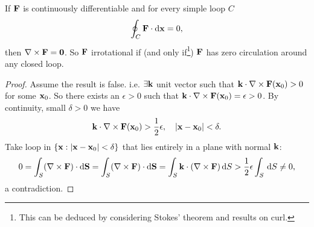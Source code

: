 \begin{proposition}
    If ${\bf F}$ is continuously differentiable and for every simple loop $C$ 
    \[
        \oint_{C} {\bf F} \cdot \mathrm{d}{\bf x} = 0,
    \]
    then $ \nabla\times {\bf F}=\mathbf{0} $. So ${\bf F}$ irrotational if (and only if\footnote{This can be deduced by considering Stokes' theorem and results on curl.}) ${\bf F}$ has zero circulation around any closed loop.
\end{proposition}
\begin{proof}
    Assume the result is false. i.e. $ \exists {\bf k} $ unit vector such that $ {\bf k} \cdot \nabla\times{\bf F}({\bf x}_0)>0 $ for some $ {\bf x}_0 $. So there exists an $\epsilon > 0$ such that $ {\bf k} \cdot \nabla\times{\bf F}({\bf x}_0)=\epsilon>0 $. By continuity, small $ \delta>0 $ we have
    \[
        {\bf k} \cdot \nabla\times{\bf F}({\bf x}_0)>\frac{1}{2}\epsilon,\quad |{\bf x}-{\bf x}_0|<\delta.
    \]
    Take loop in $ \{{\bf x}:|{\bf x}-{\bf x}_0|<\delta\} $ that lies entirely in a plane with normal ${\bf k}$:
    \[
        0=\int_{S} (\nabla\times {\bf F}) \cdot\mathrm{d}\mathbf{S} = \int_{S} (\nabla\times{\bf F}) \cdot\mathrm{d}\mathbf{S} = \int_{S} {\bf k} \cdot (\nabla\times{\bf F}) \,\mathrm{d}S>\frac{1}{2}\epsilon \int_{S}  \,\mathrm{d}S\neq 0,
    \]
    a contradiction.
\end{proof}
